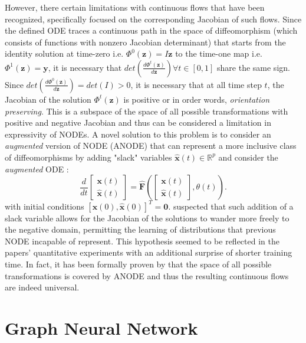 However, there certain limitations with continuous flows that have been
recognized, specifically focused on the corresponding Jacobian of such flows.
Since the defined ODE traces a continuous path in the space of diffeomorphism
(which consists of functions with nonzero Jacobian determinant) that starts from the identity solution at
time-zero i.e. $\Phi^0(\mathbf{z}) = I\mathbf{z}$ to the time-one map
i.e. $\Phi^1(\mathbf{z}) = \mathbf{y}$, it is necessary that
$det\left(\frac{d\Phi^t(\mathbf{z})}{d\mathbf{z}}\right) \forall t \in [0,1]$
share the same sign. Since
$det\left(\frac{d\Phi^0(\mathbf{z})}{d\mathbf{z}}\right) = det(I) > 0$, it is
necessary that at all time step $t$, the Jacobian of the solution
$\Phi^t(\mathbf{z})$ is positive or in order words, \textit{orientation preserving}. This
is a subspace of the space of all possible transformations with positive and
negative Jacobian and thus can be considered a limitation in expressivity of
NODEs. A novel solution to this problem is to consider an \textit{augmented} version of
NODE (ANODE) that can represent a more inclusive class of diffeomorphisms by adding
"slack" variables $\hat{\mathbf{x}}(t) \in \mathbb{R}^p$ and consider the
\textit{augmented} ODE \cite{dupontAugmentedNeuralODEs2019}:
$$
\frac{d}{dt} \begin{bmatrix}
  \mathbf{x}(t) \\
  \hat{\mathbf{x}}(t)
\end{bmatrix} = \hat{\mathbf{F}}\left( \begin{bmatrix}
  \mathbf{x}(t) \\
  \hat{\mathbf{x}}(t)
\end{bmatrix}, \theta(t)\right)
.$$
with initial conditions $[\mathbf{x}(0), \hat{\mathbf{x}}(0)]^T = \mathbf{0}$.
\cite{dupontAugmentedNeuralODEs2019} suspected that such addition of a slack
variable allows for the Jacobian of the solutions to wander more freely to the
negative domain, permitting the learning of distributions that previous NODE incapable of
represent. This hypothesis seemed to be reflected in the papers' quantitative
experiments with an additional surprise of shorter training time. In fact, it
has been formally proven by \cite{zhangApproximationCapabilitiesNeural2020} that
the space of all possible transformations is covered by ANODE and thus the
resulting continuous flows are indeed universal.


\chapter{Graph Neural Network}
\label{c:gnn}

